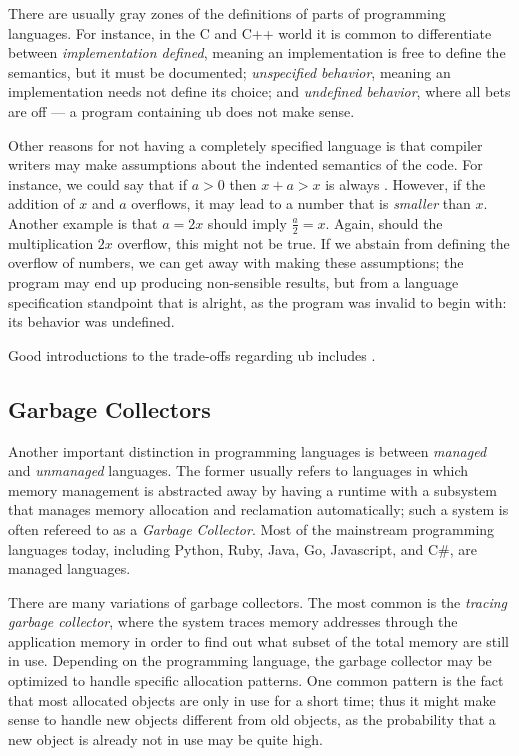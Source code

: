 There are usually gray zones of the definitions of parts of programming languages. For instance, in
the C and C++ world it is common to differentiate between \emph{implementation defined}, meaning an
implementation is free to define the semantics, but it must be documented; \emph{unspecified
behavior}, meaning an implementation needs not define its choice; and \emph{undefined behavior},
where all bets are off --- a program containing \gls{ub} does not make sense.

Other reasons for not having a completely specified language is that compiler writers may make
assumptions about the indented semantics of the code. For instance, we could say that if $a > 0$
then $x + a > x$ is always . However, if the addition of $x$ and $a$ overflows, it may
lead to a number that is \emph{smaller} than $x$. Another example is that $a = 2x$ should imply
$\frac{a}{2} = x$. Again, should the multiplication $2x$ overflow, this might not be true.
If we abstain from defining the overflow of numbers, we can get away with making these assumptions;
the program may end up producing non-sensible results, but from a language specification standpoint
that is alright, as the program was invalid to begin with: its behavior was undefined.

Good introductions to the trade-offs regarding \gls{ub} includes
\cite{regehr2017undefined,carruth2016garbage}.



\subsection{Garbage Collectors}

Another important distinction in programming languages is between \emph{managed} and
\emph{unmanaged} languages. The former usually refers to languages in which memory management is
abstracted away by having a runtime with a subsystem that manages memory allocation and reclamation
automatically; such a system is often refereed to as a \emph{Garbage Collector}. Most of the
mainstream programming languages today, including Python, Ruby, Java, Go, Javascript, and C\#, are
managed languages.

There are many variations of garbage collectors. The most common is the \emph{tracing garbage
collector}, where the system traces memory addresses through the application memory in order to
find out what subset of the total memory are still in use. Depending on the programming language,
the garbage collector may be optimized to handle specific allocation patterns. One common pattern
is the fact that most allocated objects are only in use for a short time; thus it might make sense
to handle new objects different from old objects, as the probability that a new object is already
not in use may be quite high.



